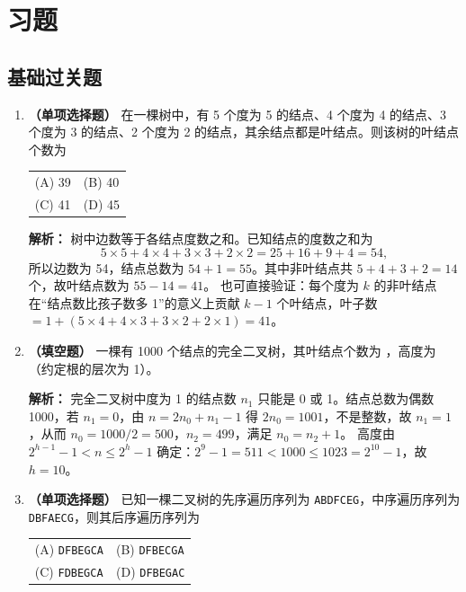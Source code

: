 \section{习题}

\subsection{基础过关题}

\begin{enumerate}

\item \textbf{（单项选择题）} 在一棵树中，有 5 个度为 5 的结点、4 个度为 4 的结点、3 个度为 3 的结点、2 个度为 2 的结点，其余结点都是叶结点。则该树的叶结点个数为
\begin{center}
\begin{tabular}{ll}
(A) 39 & (B) 40 \\[4pt]
(C) 41 & (D) 45
\end{tabular}
\end{center}

\ifshowsolutions\par\noindent\textbf{解析：} 树中边数等于各结点度数之和。已知结点的度数之和为
\[
5\times5+4\times4+3\times3+2\times2=25+16+9+4=54,
\]
所以边数为 54，结点总数为 $54+1=55$。其中非叶结点共 $5+4+3+2=14$ 个，故叶结点数为 $55-14=41$。
也可直接验证：每个度为 $k$ 的非叶结点在“结点数比孩子数多 1”的意义上贡献 $k-1$ 个叶结点，叶子数 $=1+(5\times4+4\times3+3\times2+2\times1)=41$。
\else \answerarea \fi

\item \textbf{（填空题）} 一棵有 1000 个结点的完全二叉树，其叶结点个数为 \underline{\qquad}，高度为 \underline{\qquad}（约定根的层次为 1）。

\ifshowsolutions\par\noindent\textbf{解析：} 完全二叉树中度为 1 的结点数 $n_1$ 只能是 0 或 1。结点总数为偶数 1000，若 $n_1=0$，由 $n=2n_0+n_1-1$ 得 $2n_0=1001$，不是整数，故 $n_1=1$，从而 $n_0=1000/2=500$，$n_2=499$，满足 $n_0=n_2+1$。
高度由 $2^{h-1}-1<n\leqslant 2^{h}-1$ 确定：$2^9-1=511<1000\leqslant 1023=2^{10}-1$，故 $h=10$。
\else \answerarea \fi

\item \textbf{（单项选择题）} 已知一棵二叉树的先序遍历序列为 \texttt{ABDFCEG}，中序遍历序列为 \texttt{DBFAECG}，则其后序遍历序列为
\begin{center}
\begin{tabular}{ll}
(A) \texttt{DFBEGCA} & (B) \texttt{DFBECGA} \\[4pt]
(C) \texttt{FDBEGCA} & (D) \texttt{DFBEGAC}
\end{tabular}
\end{center}


\end{enumerate}
